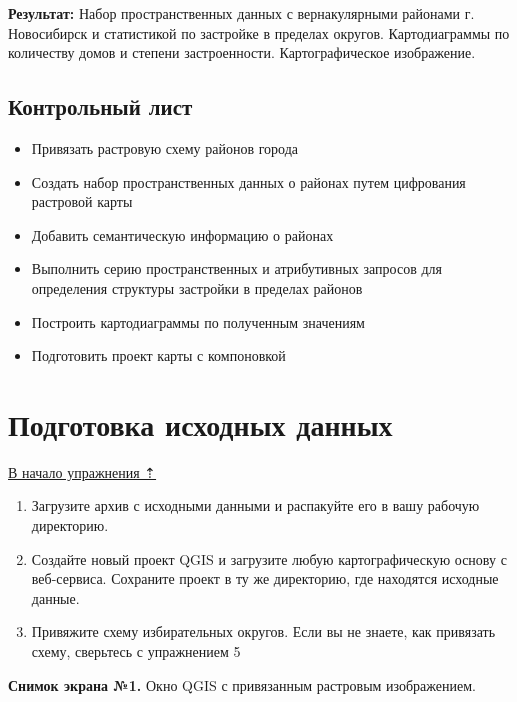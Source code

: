 \documentclass[
  12pt,
]{book}
\providecommand{\tightlist}{%
  \setlength{\itemsep}{0pt}\setlength{\parskip}{0pt}}
\begin{document}
\textbf{Результат:} Набор пространственных данных с вернакулярными районами г. Новосибирск и статистикой по застройке в пределах округов. Картодиаграммы по количеству домов и степени застроенности. Картографическое изображение.

\hypertarget{digitizing-control}{%
\subsection{Контрольный лист}\label{digitizing-control}}

\begin{itemize}
\tightlist
\item
  Привязать растровую схему районов города
\item
  Создать набор пространственных данных о районах путем цифрования растровой карты
\item
  Добавить семантическую информацию о районах
\item
  Выполнить серию пространственных и атрибутивных запросов для определения структуры застройки в пределах районов
\item
  Построить картодиаграммы по полученным значениям
\item
  Подготовить проект карты с компоновкой
\end{itemize}

\hypertarget{digitizing-basedata}{%
\section{Подготовка исходных данных}\label{digitizing-basedata}}

\protect\hyperlink{digitizingf-districts}{В начало упражнения ⇡}

\begin{enumerate}
\def\labelenumi{\arabic{enumi}.}
\item
  Загрузите архив с исходными данными и распакуйте его в вашу рабочую директорию.
\item
  Создайте новый проект QGIS и загрузите любую картографическую основу с веб-сервиса. Сохраните проект в ту же директорию, где находятся исходные данные.
\item
  Привяжите схему избирательных округов. Если вы не знаете, как привязать схему, сверьтесь с \protect\hypertarget{raster-reference}{}{упражнением 5}
\end{enumerate}

\textbf{Снимок экрана №1.} Окно QGIS с привязанным растровым изображением.
\end{document}
